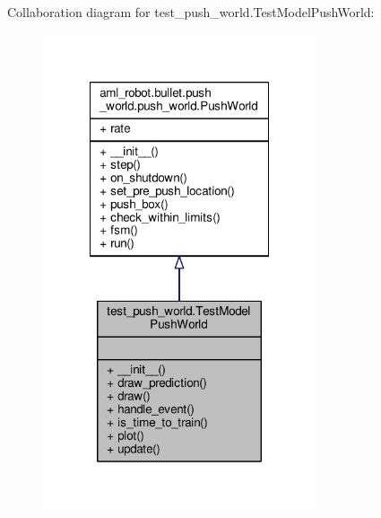 Collaboration diagram for test\-\_\-push\-\_\-world.\-Test\-Model\-Push\-World\-:\nopagebreak
\begin{figure}[H]
\begin{center}
\leavevmode
\includegraphics[width=228pt]{classtest__push__world_1_1_test_model_push_world__coll__graph}
\end{center}
\end{figure}
